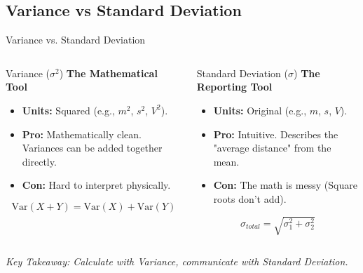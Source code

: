\subsection{Variance vs Standard Deviation}
\begin{frame}{Variance vs. Standard Deviation}
    \begin{columns}
        \begin{block}{Variance ($\sigma^2$)}
            \textbf{The Mathematical Tool}
            \begin{itemize}
                \item \textbf{Units:} Squared (e.g., $m^2$, $s^2$, $V^2$).
                \item \textbf{Pro:} Mathematically clean. Variances can be added together directly.
                \item \textbf{Con:} Hard to interpret physically.
            \end{itemize}
            \[ \text{Var}(X+Y) = \text{Var}(X) + \text{Var}(Y) \]
        \end{block}

        \begin{block}{Standard Deviation ($\sigma$)}
            \textbf{The Reporting Tool}
            \begin{itemize}
                \item \textbf{Units:} Original (e.g., $m$, $s$, $V$).
                \item \textbf{Pro:} Intuitive. Describes the "average distance" from the mean.
                \item \textbf{Con:} The math is messy (Square roots don't add).
            \end{itemize}
            \[ \sigma_{total} = \sqrt{\sigma_1^2 + \sigma_2^2} \]
        \end{block}
    \end{columns}

    \vspace{0.5cm}
    \centering
    \textit{Key Takeaway: Calculate with Variance, communicate with Standard Deviation.}
\end{frame}


